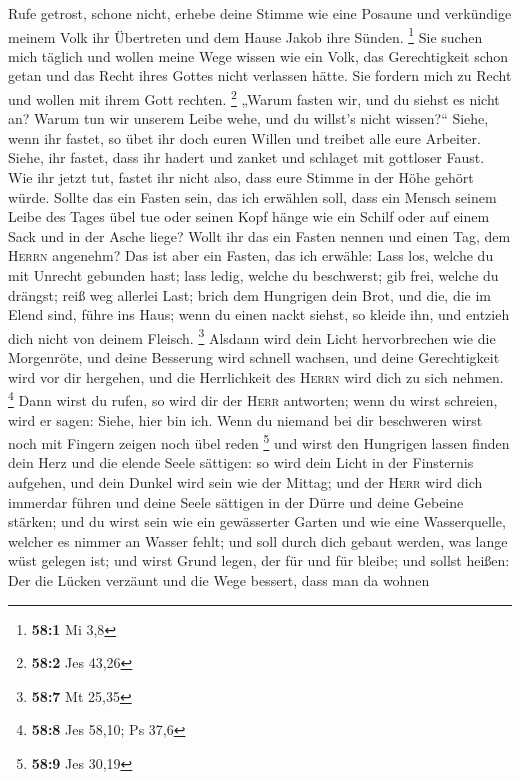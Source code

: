  Rufe getrost, schone nicht, erhebe deine Stimme wie eine
Posaune und verkündige meinem Volk ihr Übertreten und dem Hause Jakob
ihre Sünden. \footnote{\textbf{58:1} Mi 3,8}  Sie suchen
mich täglich und wollen meine Wege wissen wie ein Volk, das
Gerechtigkeit schon getan und das Recht ihres Gottes nicht verlassen
hätte. Sie fordern mich zu Recht und wollen mit ihrem Gott rechten.
\footnote{\textbf{58:2} Jes 43,26}  „Warum fasten wir, und
du siehst es nicht an? Warum tun wir unserem Leibe wehe, und du willst's
nicht wissen?{}`` Siehe, wenn ihr fastet, so übet ihr doch euren Willen
und treibet alle eure Arbeiter.  Siehe, ihr fastet, dass
ihr hadert und zanket und schlaget mit gottloser Faust. Wie ihr jetzt
tut, fastet ihr nicht also, dass eure Stimme in der Höhe gehört würde.
 Sollte das ein Fasten sein, das ich erwählen soll, dass
ein Mensch seinem Leibe des Tages übel tue oder seinen Kopf hänge wie
ein Schilf oder auf einem Sack und in der Asche liege? Wollt ihr das ein
Fasten nennen und einen Tag, dem \textsc{Herrn} angenehm? 
Das ist aber ein Fasten, das ich erwähle: Lass los, welche du mit
Unrecht gebunden hast; lass ledig, welche du beschwerst; gib frei,
welche du drängst; reiß weg allerlei Last;  brich dem
Hungrigen dein Brot, und die, die im Elend sind, führe ins Haus; wenn du
einen nackt siehst, so kleide ihn, und entzieh dich nicht von deinem
Fleisch. \footnote{\textbf{58:7} Mt 25,35}  Alsdann wird
dein Licht hervorbrechen wie die Morgenröte, und deine Besserung wird
schnell wachsen, und deine Gerechtigkeit wird vor dir hergehen, und die
Herrlichkeit des \textsc{Herrn} wird dich zu sich nehmen. \footnote{\textbf{58:8}
  Jes 58,10; Ps 37,6}  Dann wirst du rufen, so wird dir
der \textsc{Herr} antworten; wenn du wirst schreien, wird er sagen:
Siehe, hier bin ich. Wenn du niemand bei dir beschweren wirst noch mit
Fingern zeigen noch übel reden \footnote{\textbf{58:9} Jes 30,19}
 und wirst den Hungrigen lassen finden dein Herz und die
elende Seele sättigen: so wird dein Licht in der Finsternis aufgehen,
und dein Dunkel wird sein wie der Mittag;  und der
\textsc{Herr} wird dich immerdar führen und deine Seele sättigen in der
Dürre und deine Gebeine stärken; und du wirst sein wie ein gewässerter
Garten und wie eine Wasserquelle, welcher es nimmer an Wasser fehlt;
 und soll durch dich gebaut werden, was lange wüst
gelegen ist; und wirst Grund legen, der für und für bleibe; und sollst
heißen: Der die Lücken verzäunt und die Wege bessert, dass man da wohnen
